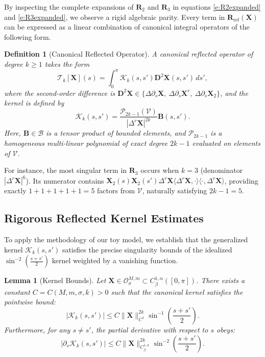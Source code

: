 \documentclass{amsart}
\newtheorem{definition}[theorem]{Definition}
\newtheorem{lemma}[theorem]{Lemma}
\begin{document}
By inspecting the complete expansions of $\mathbf{R}_2$ and $\mathbf{R}_3$ in equations \eqref{e:R2expanded} and \eqref{e:R3expanded}, we observe a rigid algebraic parity. Every term in $\mathbf{R}_{\mathrm{ref}}(\mathbf{X})$ can be expressed as a linear combination of canonical integral operators of the following form.

\begin{definition}[Canonical Reflected Operator]
A canonical reflected operator of degree $k \ge 1$ takes the form
\begin{equation}\label{eq:canonical_reflected}
\mathcal{T}_{k}[\mathbf{X}](s) = \int_0^\pi \mathcal{K}_k(s,s') \mathbf{D}^2\mathbf{X}(s,s') \, ds',
\end{equation}
where the second-order difference is $\mathbf{D}^2\mathbf{X} \in \{ \Delta \partial_s \mathbf{X},\ \Delta \partial_s \mathbf{X}^r,\ \Delta \partial_s \mathbf{X}_2 \}$, and the kernel is defined by
\begin{equation}
\mathcal{K}_k(s,s') = \frac{\mathcal{P}_{2k-1}(\mathcal{V})}{|\Delta^r \mathbf{X}|^{2k}} \mathbf{B}(s,s').
\end{equation}
Here, $\mathbf{B} \in \mathcal{B}$ is a tensor product of bounded elements, and $\mathcal{P}_{2k-1}$ is a homogeneous multi-linear polynomial of exact degree $2k-1$ evaluated on elements of $\mathcal{V}$.
\end{definition}

For instance, the most singular term in $\mathbf{R}_3$ occurs when $k=3$ (denominator $|\Delta^r \mathbf{X}|^6$). Its numerator contains $\mathbf{X}_2(s) \mathbf{X}_2(s') \Delta^r \mathbf{X} \langle \Delta^r \mathbf{X}, \cdot \rangle \langle \cdot, \Delta^r \mathbf{X} \rangle$, providing exactly $1+1+1+1+1 = 5$ factors from $\mathcal{V}$, naturally satisfying $2k-1=5$.

\subsection{Rigorous Reflected Kernel Estimates}

To apply the methodology of our toy model, we establish that the generalized kernel $\mathcal{K}_k(s,s')$ satisfies the precise singularity bounds of the idealized $\sin^{-2}(\frac{s+s'}{2})$ kernel weighted by a vanishing function.

\begin{lemma}[Kernel Bounds]\label{lem:kernel_bounds}
Let $\mathbf{X} \in \mathcal{O}^{M,m}_\sigma \subset C^{1,\alpha}_\beta([0,\pi])$. There exists a constant $C = C(M, m, \sigma, k) > 0$ such that the canonical kernel satisfies the pointwise bound:
\begin{equation}\label{eq:K_bound}
|\mathcal{K}_k(s,s')| \le C \|\mathbf{X}\|_{C^1}^{2k} \sin^{-1}\left(\frac{s+s'}{2}\right).
\end{equation}
Furthermore, for any $s \neq s'$, the partial derivative with respect to $s$ obeys:
\begin{equation}\label{eq:dK_bound}
|\partial_s \mathcal{K}_k(s,s')| \le C \|\mathbf{X}\|_{C^{1,\alpha}_\beta}^{2k} \sin^{-2}\left(\frac{s+s'}{2}\right).
\end{equation}
\end{lemma}
\end{document}
